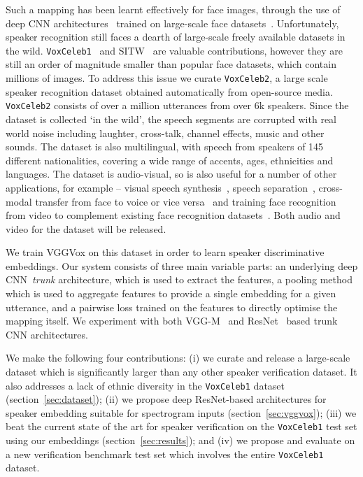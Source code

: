 \documentclass[a4paper]{article}
\begin{document}
Such a mapping has been learnt effectively for face images, through
the use of deep CNN
architectures~\cite{Schroff15,taigman2014deepface,Parkhi15} trained on
large-scale face
datasets~\cite{cao2017vggface2,kemelmacher2016megaface,guo2016ms}. Unfortunately,
speaker recognition still faces a dearth of large-scale freely
available datasets in the wild. \texttt{VoxCeleb1}~\cite{Nagrani17}
and SITW~\cite{Mclaren16} are valuable contributions, however they are
still an order of magnitude smaller than popular face datasets, which
contain millions of images. To address this issue we curate
\texttt{VoxCeleb2}, a large scale speaker recognition dataset obtained
automatically from open-source media. \texttt{VoxCeleb2} consists of
over a million utterances from over 6k speakers. Since the dataset is
collected `in the wild', the speech segments are corrupted with real
world noise including laughter, cross-talk, channel effects, music and
other sounds. The dataset is also multilingual, with speech from
speakers of 145 different nationalities, covering a wide range of
accents, ages, ethnicities and languages. 
 The dataset is audio-visual,
 so is also useful for a number of other applications, for example --
 visual speech synthesis~\cite{Chung17b,karras2017audio}, speech separation~\cite{Afouras18,ephrat2018looking}, cross-modal transfer from face to voice or vice versa~\cite{Nagrani18a,nagrani2018learnable}
 and training face recognition
from video to complement existing face recognition datasets~\cite{cao2017vggface2,kemelmacher2016megaface,guo2016ms}. 
Both audio
 and video for the dataset will be released.

We train VGGVox on this dataset in order to learn speaker
discriminative embeddings. Our system consists of three main variable
parts: an underlying deep CNN~\textit{trunk} architecture, which is
used to extract the features, a pooling method which is used to
aggregate features to provide a single embedding for a given
utterance, and a pairwise loss trained on the features to directly
optimise the mapping itself. We experiment with both VGG-M~\cite{Chatfield14} and ResNet~\cite{He15} 
based trunk CNN architectures.

We make the following four contributions: (i) we curate and release a
large-scale dataset which is significantly larger than any other
speaker verification dataset. It also addresses a lack of ethnic
diversity in the \texttt{VoxCeleb1} dataset
(section~\ref{sec:dataset}); (ii) we propose deep ResNet-based
architectures for speaker embedding suitable for spectrogram inputs
(section~\ref{sec:vggvox}); (iii) we beat the current state of the art for speaker
verification on the \texttt{VoxCeleb1}  test set using our embeddings
(section~\ref{sec:results}); and (iv) we propose 
and evaluate on a new
verification benchmark test set which involves the entire \texttt{VoxCeleb1}  dataset.
\end{document}

